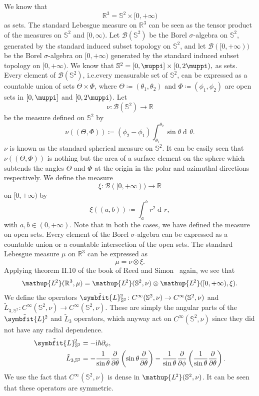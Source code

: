 \documentclass[12pt, a4 paper]{article}
\theoremstyle{definition}
\newcommand{\ltwo}{\mathup{L\kern-0.7pt^2}}
\newcommand{\rthree}{\mathbb{R}^3}
\newcommand{\rr}{\mathbb{R}}
\renewcommand{\i}{\mathrm{i}}
\renewcommand{\pi}{\muppi}
\newcommand{\lvecsquare}{\tilde{\symbfit{L}}\kern-1pt^2}
\newcommand{\der}{\operatorname{d\!}{}}
\begin{document}
	We know that \[\rthree = \mathbb{S}^2 \times [0, +\infty)\] as sets. The standard Lebesgue measure on $\rthree$ can be seen as the tensor product of the measures on $\mathbb{S}^2$ and $[0, \infty)$. Let $\mathcal{B}(\mathbb{S}^2)$ be the Borel $\sigma$-algebra on $\mathbb{S}^2$, generated by the standard induced subset topology on $\mathbb{S}^2$, and let $\mathcal{B}([0,+\infty))$ be the Borel $\sigma$-algebra on $[0, +\infty)$ generated by the standard induced subset topology on $[0, +\infty)$. We know that $\mathbb{S}^2 = [0, \pi] \times [0, 2\pi),$ as sets. Every element of $\mathcal{B}(\mathbb{S}^2)$, i.e.\@ every measurable set of $\mathbb{S}^2$, can be expressed as a countable union of sets $\Theta \times \Phi$, where $\Theta \coloneq (\theta_1, \theta_2)$ and $\Phi \coloneq (\phi_1, \phi_2)$ are open sets in $[0, \pi]$ and $[0, 2\pi)$. Let
	\[
		\nu \colon \mathcal{B}(\mathbb{S}^2) \rightarrow \rr
	\]
	be the measure defined on $\mathbb{S}^2$ by
	\[
	    \nu((\Theta, \Phi)) \coloneq (\phi_2 - \phi_1) \int_{\theta_1}^{\theta_2}\sin{\theta}\der \theta.
	\]
	$\nu$ is known as the standard spherical measure on $\mathbb{S}^2$. It can be easily seen that $\nu((\Theta, \Phi))$ is nothing but the area of a surface element on the sphere which subtends the angles $\Theta$ and $\Phi$ at the origin in the polar and azimuthal directions respectively. We define the measure
	\[
		\xi \colon \mathcal{B}([0, +\infty)) \rightarrow \rr
	\]
	on $[0, +\infty)$ by
	\[
		\xi((a, b)) \coloneq \int_a^b r^2\! \der r,
	\]
	with $a, b \in (0, +\infty)$. Note that in both the cases, we have defined the measure on open sets. Every element of the Borel $\sigma$-algebra can be expressed as a countable union or a countable intersection of the open sets. The standard Lebesgue measure $\mu$ on $\rthree$ can be expressed as
	\[
		\mu = \nu \otimes \xi.
	\]
	Applying theorem II.10 of the book of Reed and Simon~\cite[p.~52]{Reed} again, we see that
	\begin{align}
		\ltwo(\rthree, \mu) = \ltwo(\mathbb{S}^2, \nu) \otimes \ltwo([0, +\infty), \xi).
	\end{align}
	We define the operators $\lvecsquare_{\,\mathbb{S}^2} \colon C^\infty(\mathbb{S}^2, \nu) \rightarrow C^\infty(\mathbb{S}^2, \nu)$ and $\tilde{L}_{3, \mathbb{S}^2} \colon C^\infty(\mathbb{S}^2, \nu) \rightarrow C^\infty(\mathbb{S}^2, \nu)$. These are simply the angular parts of the $\lvecsquare$ and $\tilde{L}_3$ operators, which anyway act on $C^\infty(\mathbb{S}^2, \nu)$ since they did not have any radial dependence.
	\begin{align*}
	    \lvecsquare_{\,\mathbb{S}^2} &= -\i\hbar\partial_\phi,\\
		\tilde{L}_{3, \mathbb{S}^2}  &= -\frac{1}{\sin{\theta}}\frac{\partial}{\partial \theta}\left(\sin{\theta}\frac{\partial}{\partial\theta}\right) -\frac{1}{\sin{\theta}}\frac{\partial}{\partial\phi}\left(\frac{1}{\sin{\theta}}\frac{\partial}{\partial\theta}\right).
	\end{align*}
	We use the fact that $C^\infty(\mathbb{S}^2, \nu)$ is dense in $\ltwo(\mathbb{S}^2, \nu)$. It can be seen that these operators are symmetric.
\end{document}
